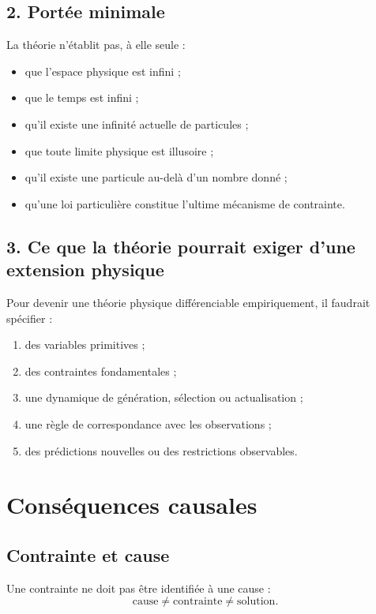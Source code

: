\documentclass[11pt,a4paper]{article}
\begin{document}
\subsection{2. Portée minimale}

La théorie n'établit pas, à elle seule :
\begin{itemize}
    \item que l'espace physique est infini ;
    \item que le temps est infini ;
    \item qu'il existe une infinité actuelle de particules ;
    \item que toute limite physique est illusoire ;
    \item qu'il existe une particule au-delà d'un nombre donné ;
    \item qu'une loi particulière constitue l'ultime mécanisme de contrainte.
\end{itemize}

\subsection{3. Ce que la théorie pourrait exiger d'une extension physique}

Pour devenir une théorie physique différenciable empiriquement, il faudrait
spécifier :
\begin{enumerate}
    \item des variables primitives ;
    \item des contraintes fondamentales ;
    \item une dynamique de génération, sélection ou actualisation ;
    \item une règle de correspondance avec les observations ;
    \item des prédictions nouvelles ou des restrictions observables.
\end{enumerate}

\section{Conséquences causales}

\subsection{Contrainte et cause}

Une contrainte ne doit pas être identifiée à une cause :
\[
\boxed{
\text{cause}\neq\text{contrainte}\neq\text{solution}.
}
\]
\end{document}
